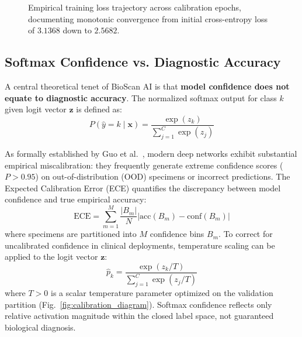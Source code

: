 \documentclass[11pt,a4paper]{article}
\begin{document}
\begin{figure}[htbp]
\centering
{}
\caption{Empirical training loss trajectory across calibration epochs, documenting monotonic convergence from initial cross-entropy loss of $3.1368$ down to $2.5682$.}
\label{fig:loss_curve}
\end{figure}

\subsection{Softmax Confidence vs. Diagnostic Accuracy}
A central theoretical tenet of BioScan AI is that \textbf{model confidence does not equate to diagnostic accuracy}. The normalized softmax output for class $k$ given logit vector $\mathbf{z}$ is defined as:
\begin{equation}
P(\hat{y} = k \mid \mathbf{x}) = \frac{\exp(z_k)}{\sum_{j=1}^{C} \exp(z_j)}
\label{eq:softmax_eq}
\end{equation}

As formally established by Guo et al.~\cite{guo2017calibration}, modern deep networks exhibit substantial empirical miscalibration: they frequently generate extreme confidence scores ($P > 0.95$) on out-of-distribution (OOD) specimens or incorrect predictions. The Expected Calibration Error (ECE) quantifies the discrepancy between model confidence and true empirical accuracy:
\begin{equation}
\text{ECE} = \sum_{m=1}^{M} \frac{|B_m|}{N} \left| \text{acc}(B_m) - \text{conf}(B_m) \right|
\label{eq:ece}
\end{equation}
where specimens are partitioned into $M$ confidence bins $B_m$. To correct for uncalibrated confidence in clinical deployments, temperature scaling can be applied to the logit vector $\mathbf{z}$:
\begin{equation}
\hat{p}_k = \frac{\exp(z_k / T)}{\sum_{j=1}^C \exp(z_j / T)}
\label{eq:temperature}
\end{equation}
where $T > 0$ is a scalar temperature parameter optimized on the validation partition (Fig.~\ref{fig:calibration_diagram}). Softmax confidence reflects only relative activation magnitude within the closed label space, not guaranteed biological diagnosis.
\end{document}

